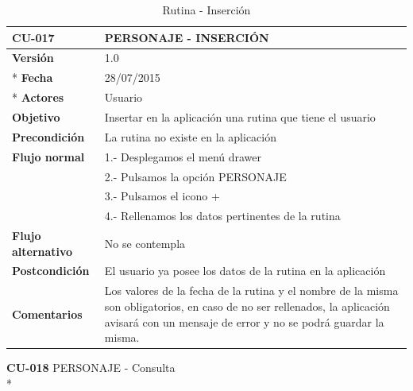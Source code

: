 \documentclass[../pfc.tex]{subfiles}
\begin{document}
		\begin{table}[H]
			\centering
			\begin{tabular}[t]{|p{3cm}|p{9.5cm}|}
				\hline \textbf{CU-017} & \textbf{PERSONAJE - INSERCIÓN} \\*
				\hline\hline \textbf{Versión} & 1.0 \\ *
				\hline\hline \textbf{Fecha} & 28/07/2015 \\ *
				\hline\textbf{Actores} 	& Usuario\\*
				\hline \textbf{Objetivo} & Insertar en la aplicación una rutina que tiene el usuario\\* 			
				\hline \textbf{Precondición} & La rutina no existe en la aplicación\\* 
				\hline \textbf{Flujo normal} & 1.- Desplegamos el menú drawer \\* 
				& 2.- Pulsamos la opción PERSONAJE\\*	
				& 3.- Pulsamos el icono +\\*	
				& 4.- Rellenamos los datos pertinentes de la rutina\\*	
				\hline \textbf{Flujo alternativo} & No se contempla \\* 
				\hline \textbf{Postcondición} & El usuario ya posee los datos de la rutina en la aplicación \\* 
				\hline \textbf{Comentarios}   & Los valores de la fecha de la rutina y el nombre de la misma son obligatorios, en caso de no ser rellenados, la aplicación avisará con un mensaje de error y no se podrá guardar la misma.\\*
				\hline
			\end{tabular}
			\caption{Rutina - Inserción}
			\label{tabla:caso017}
		\end{table}
		
		
		
		
		\textbf{CU-018}	PERSONAJE - Consulta\\*
		
\end{document}
